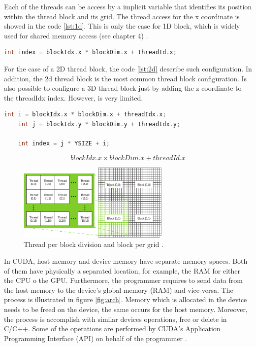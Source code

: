 Each of the threads can be access by a implicit variable that identifies its position within the thread block and its grid. The thread access for the x coordinate is showed in the code \ref{lst:1d}. This is only the case for 1D block, which is widely used for shared memory access (see chapter 4) \cite{example}.

\begin{lstlisting}[language=C++, label={lst:1d}, caption={1D block}]	
	int index = blockIdx.x * blockDim.x + threadId.x;
\end{lstlisting}

For the case of a 2D thread block, the code \ref{lst:2d} describe such configuration. In addition, the 2d thread block is the most common thread block configuration. Is also possible to configure a 3D thread block just by adding the z coordinate to the threadIdx index. However, is very limited.

\begin{lstlisting}[language=C++, label={lst:2d}, caption={2D block}]	
    int i = blockIdx.x * blockDim.x + threadIdx.x;
    int j = blockIdx.y * blockDim.y + threadIdx.y;
    
    int index = j * YSIZE + i;
\end{lstlisting}

$$blockIdx.x \times blockDim.x + threadId.x$$

\begin{figure}[htbp]
	\centering
		\includegraphics[width=0.66\textwidth]{Figures/grid.png}
		\smallskip
	\caption[CUDA's 2D thread grid]{Thread per block division and block per grid \cite{hwu}.}
	\label{fig:grid}
\end{figure}

In CUDA, host memory and device memory have separate memory spaces. Both of them have physically a separated location, for example, the RAM for either the CPU o the GPU. Furthermore, the programmer requires to send data from the host memory to the device's global memory (RAM) and vice-versa. The process is illustrated in figure \ref{fig:arch}. Memory which is allocated in the device needs to be freed on the device, the same occurs for the host memory. Moreover, the process is accomplish with similar devices operations, free or delete in C/C++. Some of the operations are performed by CUDA's Application Programming Interface (API) on behalf of the programmer \cite{hwu}.

